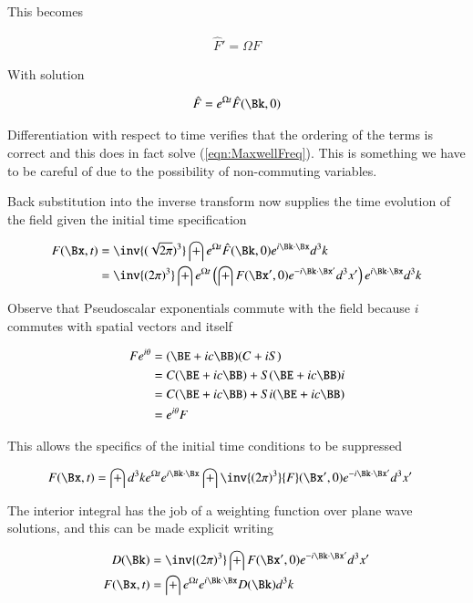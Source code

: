 This becomes

\begin{align}\label{eqn:MaxwellFreq}
\hat{F}' = \Omega F
\end{align}

With solution

\begin{align}
\hat{F} = e^{\Omega t} \hat{F}(\Bk,0)
\end{align}

Differentiation with respect to time verifies that the ordering of the terms is correct and this does in fact solve (\ref{eqn:MaxwellFreq}).  This is something we have to be careful of due to the possibility of non-commuting variables.

Back substitution into the inverse transform now supplies the time evolution of the field given the initial time specification

\begin{align*}
F(\Bx,t)
&= \inv{(\sqrt{2\pi})^3} \int e^{\Omega t} \hat{F}(\Bk,0) e^{i \Bk \cdot \Bx} d^3 k \\
&= \inv{(2\pi)^3} \int e^{\Omega t} \left( \int {F}(\Bx',0) e^{-i \Bk \cdot \Bx'} d^3 x' \right) e^{i \Bk \cdot \Bx} d^3 k
\end{align*}

Observe that Pseudoscalar exponentials commute with the field because $i$ commutes with spatial vectors and itself

\begin{align*}
F e^{i\theta}
&= (\BE + i c \BB) (C + iS) \\
&=
C (\BE + i c \BB)
+ S (\BE + i c \BB) i  \\
&=
C (\BE + i c \BB)
+ S i (\BE + i c \BB) \\
&=
e^{i\theta} F
\end{align*}

This allows the specifics of the initial time conditions to be suppressed

\begin{align}
F(\Bx,t) &= \int d^3 k e^{\Omega t} e^{i \Bk \cdot \Bx} \int \inv{(2\pi)^3} {F}(\Bx',0) e^{-i \Bk \cdot \Bx'}  d^3 x'
\end{align}

The interior integral has the job of a weighting function over plane wave solutions, and this can be made explicit writing

\begin{align}
D(\Bk) &= \inv{(2\pi)^3} \int {F}(\Bx',0) e^{-i \Bk \cdot \Bx'}  d^3 x' \\
F(\Bx,t) &= \int e^{\Omega t} e^{i \Bk \cdot \Bx} D(\Bk) d^3 k
\end{align}

